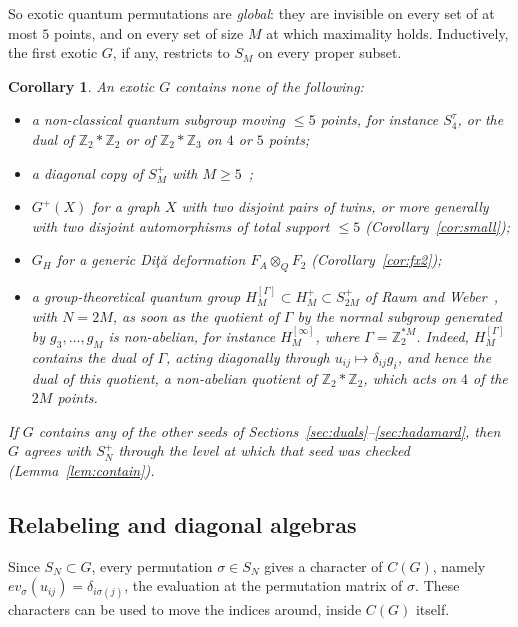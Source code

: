 \documentclass[11pt]{amsart}
\newtheorem{corollary}[theorem]{Corollary}
\theoremstyle{definition}
\theoremstyle{remark}
\theoremstyle{plain}
\numberwithin{equation}{section}
\numberwithin{table}{section}
\newcommand{\Z}{\mathbb Z}
\begin{document}
So exotic quantum permutations are \emph{global}: they are invisible on every set of at most $5$ points, and on every set of size $M$ at which maximality holds. Inductively, the first exotic $G$, if any, restricts to $S_M$ on every proper subset.

\begin{corollary}\label{cor:nocontain}
An exotic $G$ contains none of the following:
\begin{itemize}
\item a non-classical quantum subgroup moving $\le5$ points, for instance $S_4^\tau$, or the dual of $\Z_2*\Z_2$ or of $\Z_2*\Z_3$ on $4$ or $5$ points;
\item a diagonal copy of $S_M^+$ with $M\ge5$~\cite[Ex.~3.9, Prop.~3.10]{bcf};
\item $G^+(X)$ for a graph $X$ with two disjoint pairs of twins, or more generally with two disjoint automorphisms of total support $\le5$ (Corollary~\ref{cor:small});
\item $G_H$ for a generic Di{\c t}{\u a} deformation $F_A\otimes_QF_2$ (Corollary~\ref{cor:fx2});
\item a group-theoretical quantum group $H_M^{[\Gamma]}\subset H_M^+\subset S_{2M}^+$ of Raum and Weber~\cite{rw2,rw}, with $N=2M$, as soon as the quotient of $\Gamma$ by the normal subgroup generated by $g_3,\dots,g_M$ is non-abelian, for instance $H_M^{[\infty]}$, where $\Gamma=\Z_2^{*M}$. Indeed, $H_M^{[\Gamma]}$ contains the dual of $\Gamma$, acting diagonally through $u_{ij}\mapsto\delta_{ij}g_i$, and hence the dual of this quotient, a non-abelian quotient of $\Z_2*\Z_2$, which acts on $4$ of the $2M$ points.
\end{itemize}
If $G$ contains any of the other seeds of Sections~\ref{sec:duals}--\ref{sec:hadamard}, then $G$ agrees with $S_N^+$ through the level at which that seed was checked (Lemma~\ref{lem:contain}).
\end{corollary}

\subsection{Relabeling and diagonal algebras}\label{sec:diagonal}

Since $S_N\subset G$, every permutation $\sigma\in S_N$ gives a character of $C(G)$, namely $ev_\sigma(u_{ij})=\delta_{i\sigma(j)}$, the evaluation at the permutation matrix of $\sigma$. These characters can be used to move the indices around, inside $C(G)$ itself.
\end{document}
